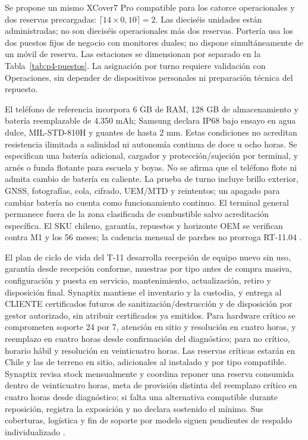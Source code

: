 Se propone un mismo XCover7 Pro compatible para los catorce operacionales y dos reservas precargadas: $\lceil14\times0,10\rceil=2$. Las dieciséis unidades están administradas; no son dieciséis operacionales más dos reservas. Portería usa los dos puestos fijos de negocio con monitores duales; no dispone simultáneamente de un móvil de reserva. Las estaciones se dimensionan por separado en la Tabla~\ref{tab:p4-puestos}. La asignación por turno requiere validación con Operaciones, sin depender de dispositivos personales ni preparación técnica del repuesto.

El teléfono de referencia incorpora 6 GB de RAM, 128 GB de almacenamiento y batería reemplazable de 4.350 mAh; Samsung declara IP68 bajo ensayo en agua dulce, MIL-STD-810H y guantes de hasta 2 mm. Estas condiciones no acreditan resistencia ilimitada a salinidad ni autonomía continua de doce u ocho horas. Se especifican una batería adicional, cargador y protección/sujeción por terminal, y arnés o funda flotante para escuela y boyas. No se afirma que el teléfono flote ni admita cambio de batería en caliente. La prueba de turno incluye brillo exterior, GNSS, fotografías, cola, cifrado, UEM/MTD y reintentos; un apagado para cambiar batería no cuenta como funcionamiento continuo. El terminal general permanece fuera de la zona clasificada de combustible salvo acreditación específica. El SKU chileno, garantía, repuestos y horizonte OEM se verifican contra M1 y los 56 meses; la cadencia mensual de parches no prorroga RT-11.04 \parencites{p3-xcover,p3-samsung-parches}[RT-08.10--14, p.~19]{pucv-transversal}.

El plan de ciclo de vida del T-11 desarrolla recepción de equipo nuevo sin uso, garantía desde recepción conforme, muestras por tipo antes de compra masiva, configuración y puesta en servicio, mantenimiento, actualización, retiro y disposición final. Synaptix mantiene el inventario y la custodia, y entrega al CLIENTE certificados futuros de sanitización/destrucción y de disposición por gestor autorizado, sin atribuir certificados ya emitidos. Para hardware crítico se comprometen soporte 24 por 7, atención en sitio y resolución en cuatro horas, y reemplazo en cuatro horas desde confirmación del diagnóstico; para no crítico, horario hábil y resolución en veinticuatro horas. Las reservas críticas estarán en Chile y las de terreno en sitio, adicionales al instalado y por tipo compatible. Synaptix revisa stock mensualmente y coordina reponer una reserva consumida dentro de veinticuatro horas, meta de provisión distinta del reemplazo crítico en cuatro horas desde diagnóstico; si falta una alternativa compatible durante reposición, registra la exposición y no declara sostenido el mínimo. Sus coberturas, logística y fin de soporte por modelo siguen pendientes de respaldo individualizado \parencite[secc.~8.4, pp.~19--20; RT-08.16--18, p.~20]{pucv-transversal}.

